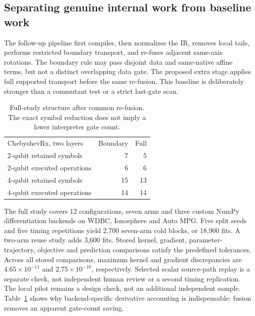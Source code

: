 \subsection{Separating genuine internal work from baseline work}
The follow-up pipeline first compiles, then normalizes the IR, removes
local tails, performs restricted boundary transport, and re-fuses
adjacent same-axis rotations. The boundary rule may pass disjoint data
and same-native affine terms, but not a distinct overlapping data gate.
The proposed extra stage applies full supported transport before the
same re-fusion. This baseline is deliberately stronger than a
commutant test or a strict last-gate scan.

\begin{table}[t]
\caption{Full-study structure after common re-fusion. The exact
symbol reduction does not imply a lower interpreter gate count.}
\label{tab:strong}
\begin{tabular}{lrr}
\toprule
ChebyshevRx, two layers & Boundary & Full\\
2-qubit retained symbols & 7 & 5\\
2-qubit executed operations & 6 & 6\\
4-qubit retained symbols & 15 & 13\\
4-qubit executed operations & 14 & 14\\
\bottomrule
\end{tabular}
\end{table}

The full study covers 12 configurations, seven arms and three custom
NumPy differentiation backends on WDBC, Ionosphere and Auto MPG.
Five split seeds and five timing repetitions yield 2,700 seven-arm
cold blocks, or 18,900 fits. A two-arm reuse study adds 3,600 fits.
Stored kernel, gradient, parameter-trajectory, objective and prediction
comparisons satisfy the predefined tolerances. Across all stored
comparisons, maximum kernel and gradient discrepancies are
$4.65\times10^{-11}$ and $2.75\times10^{-10}$, respectively.
Selected scalar source-path replay is a separate check, not independent
human review or a second timing replication. The local pilot remains
a design check, not an additional independent sample.
Table~\ref{tab:strong} shows why backend-specific derivative accounting
is indispensable: fusion removes an apparent gate-count saving.



